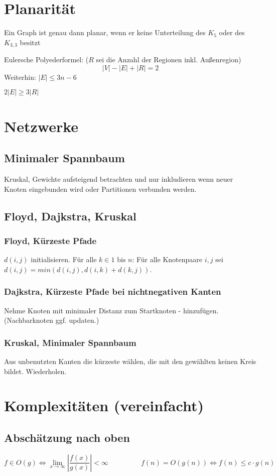 \documentclass[10pt,a4paper]{article}
\newcommand{\abs}[1]{\ensuremath{\left\vert#1\right\vert}}
\begin{document}
\section{Planarität}
Ein Graph ist genau dann planar, wenn er keine Unterteilung des $K_5$ oder des $K_{3,3}$ besitzt

Eulersche Polyederformel: ($R$ sei die Anzahl der Regionen inkl. Außenregion)
\[|V|-|E|+|R|=2\]
Weiterhin: $|E| \leq 3n -6$

$2|E| \geq 3|R|$
\section{Netzwerke}
\subsection{Minimaler Spannbaum}
Kruskal, Gewichte aufsteigend betrachten und nur inkludieren wenn neuer Knoten eingebunden wird oder Partitionen verbunden werden.
\subsection{Floyd, Dajkstra, Kruskal}
\subsubsection{Floyd, Kürzeste Pfade}
$d(i,j)$ initialisieren. Für alle $k \in 1 \mbox{ bis } n$: Für alle Knotenpaare $i, j$ sei $d(i, j) = min (d(i,j), d(i,k) + d(k,j))$.
\subsubsection{Dajkstra, Kürzeste Pfade bei nichtnegativen Kanten}
Nehme Knoten mit minimaler Distanz zum Startknoten - hinzufügen. (Nachbarknoten ggf. updaten.)
\subsubsection{Kruskal, Minimaler Spannbaum}
Aus unbenutzten Kanten die kürzeste wählen, die mit den gewählten keinen Kreis bildet. Wiederholen.
\section{Komplexitäten (vereinfacht)}
\subsection{Abschätzung nach oben}
\[f \in O(g) \Leftrightarrow \lim_{x \rightarrow \infty} \abs{\frac{f(x)}{g(x)}} < \infty  \,\,\,\,\,\,\,\,\,\,\,\,\,\,\,\,\,\,\,\,\,\,\,\,\,\,\,\, f(n) = O(g(n)) \Leftrightarrow f(n) \leq c \cdot g(n)\]
\end{document}
